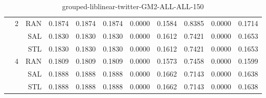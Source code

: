 \begin{center}
\begin{table}[htbp]
\begin{center}
\begin{tabular}{ | r | r | r | r | r | r | r | r | r | r | r |}
 & \multirow{3}{*}{2} & RAN & 0.1874 & 0.1874 & 0.1874 & 0.0000 & 0.1584 & 0.8385 & 0.0000 & 0.1714\\ \cline{3-11}
 &   & SAL & 0.1830 & 0.1830 & 0.1830 & 0.0000 & 0.1612 & 0.7421 & 0.0000 & 0.1653\\ \cline{3-11}
 &   & STL & 0.1830 & 0.1830 & 0.1830 & 0.0000 & 0.1612 & 0.7421 & 0.0000 & 0.1653\\ \cline{2-11}
 & \multirow{3}{*}{4} & RAN & 0.1809 & 0.1809 & 0.1809 & 0.0000 & 0.1573 & 0.7458 & 0.0000 & 0.1599\\ \cline{3-11}
 &   & SAL & 0.1888 & 0.1888 & 0.1888 & 0.0000 & 0.1662 & 0.7143 & 0.0000 & 0.1638\\ \cline{3-11}
 &   & STL & 0.1888 & 0.1888 & 0.1888 & 0.0000 & 0.1662 & 0.7143 & 0.0000 & 0.1638\\ \cline{2-11}
\hline
\end{tabular}
\caption{grouped-liblinear-twitter-GM2-ALL-ALL-150}
\end{center}
 \end{table}
\end{center}

